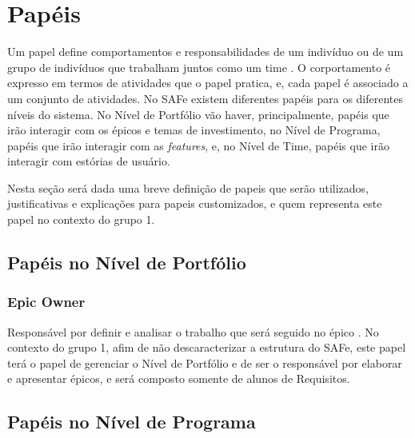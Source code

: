 \section{Papéis}
Um papel define comportamentos e responsabilidades de um indivíduo ou de um grupo de indivíduos que trabalham juntos como um time \cite[p. 61-65]{kruchten001}. O corportamento é expresso em termos de atividades que o papel pratica, e, cada papel é associado a um conjunto de atividades. No SAFe existem diferentes papéis para os diferentes níveis do sistema. No Nível de Portfólio vão haver, principalmente, papéis que irão interagir com os épicos e temas de investimento, no Nível de Programa, papéis que irão interagir com as \emph{features}, e, no Nível de Time, papéis que irão interagir com estórias de usuário.

Nesta seção será dada uma breve definição de papeis que serão utilizados, justificativas e explicações para papeis customizados, e quem representa este papel no contexto do grupo 1.

\subsection{Papéis no Nível de Portfólio}
\subsubsection{Epic Owner}
Responsável por definir e analisar o trabalho que será seguido no épico \cite[p. 418-419]{safe001}. No contexto do grupo 1, afim de não descaracterizar a estrutura do SAFe, este papel terá o papel de gerenciar o Nível de Portfólio e de ser o responsável por elaborar e apresentar épicos, e será composto somente de alunos de Requisitos.


\subsection{Papéis no Nível de Programa}

